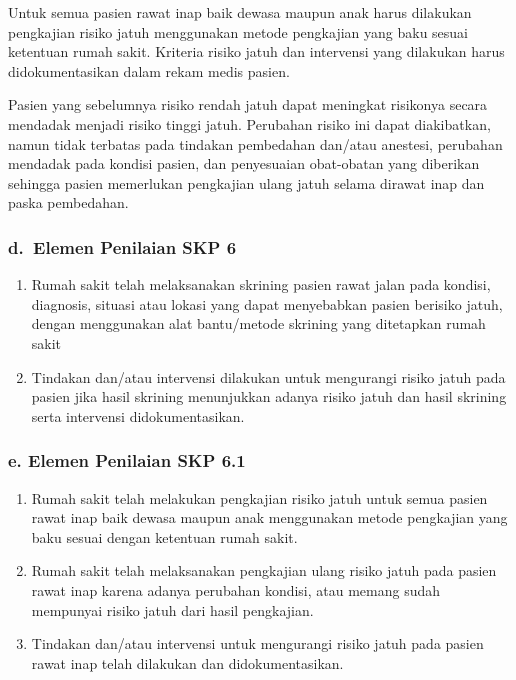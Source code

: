 \documentclass[
]{book}
\providecommand{\tightlist}{%
  \setlength{\itemsep}{0pt}\setlength{\parskip}{0pt}}
\begin{document}
Untuk semua pasien rawat inap baik dewasa maupun anak harus dilakukan pengkajian risiko jatuh menggunakan metode pengkajian yang baku sesuai ketentuan rumah sakit. Kriteria risiko jatuh dan intervensi yang dilakukan harus didokumentasikan dalam rekam medis pasien.

Pasien yang sebelumnya risiko rendah jatuh dapat meningkat risikonya secara mendadak menjadi risiko tinggi jatuh. Perubahan risiko ini dapat diakibatkan, namun tidak terbatas pada tindakan pembedahan dan/atau anestesi, perubahan mendadak pada kondisi pasien, dan penyesuaian obat-obatan yang diberikan sehingga pasien memerlukan pengkajian ulang jatuh selama dirawat inap dan paska pembedahan.

\hypertarget{d.-elemen-penilaian-skp-6}{%
\subsubsection*{d.~Elemen Penilaian SKP 6}\label{d.-elemen-penilaian-skp-6}}

\begin{enumerate}
\def\labelenumi{\arabic{enumi}.}
\tightlist
\item
  Rumah sakit telah melaksanakan skrining pasien rawat jalan pada kondisi, diagnosis, situasi atau lokasi yang dapat menyebabkan pasien berisiko jatuh, dengan menggunakan alat bantu/metode skrining yang ditetapkan rumah sakit
\item
  Tindakan dan/atau intervensi dilakukan untuk mengurangi risiko jatuh pada pasien jika hasil skrining menunjukkan adanya risiko jatuh dan hasil skrining serta intervensi didokumentasikan.
\end{enumerate}

\hypertarget{e.-elemen-penilaian-skp-6.1}{%
\subsubsection*{e. Elemen Penilaian SKP 6.1}\label{e.-elemen-penilaian-skp-6.1}}

\begin{enumerate}
\def\labelenumi{\arabic{enumi}.}
\tightlist
\item
  Rumah sakit telah melakukan pengkajian risiko jatuh untuk semua pasien rawat inap baik dewasa maupun anak menggunakan metode pengkajian yang baku sesuai dengan ketentuan rumah sakit.
\item
  Rumah sakit telah melaksanakan pengkajian ulang risiko jatuh pada pasien rawat inap karena adanya perubahan kondisi, atau memang sudah mempunyai risiko jatuh dari hasil pengkajian.
\item
  Tindakan dan/atau intervensi untuk mengurangi risiko jatuh pada pasien rawat inap telah dilakukan dan didokumentasikan.
\end{enumerate}
\end{document}
